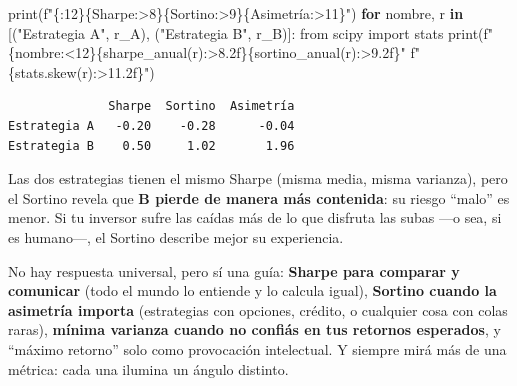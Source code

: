 \documentclass[
  spanish,
  letterpaper,
  DIV=11,
  numbers=noendperiod]{scrreprt}
\newenvironment{Shaded}{\begin{snugshade}}{\end{snugshade}}
\newcommand{\BuiltInTok}[1]{\textcolor[rgb]{0.00,0.23,0.31}{#1}}
\newcommand{\ControlFlowTok}[1]{\textcolor[rgb]{0.00,0.23,0.31}{\textbf{#1}}}
\newcommand{\ImportTok}[1]{\textcolor[rgb]{0.00,0.46,0.62}{#1}}
\newcommand{\KeywordTok}[1]{\textcolor[rgb]{0.00,0.23,0.31}{\textbf{#1}}}
\newcommand{\NormalTok}[1]{\textcolor[rgb]{0.00,0.23,0.31}{#1}}
\newcommand{\SpecialCharTok}[1]{\textcolor[rgb]{0.37,0.37,0.37}{#1}}
\newcommand{\SpecialStringTok}[1]{\textcolor[rgb]{0.13,0.47,0.30}{#1}}
\newcommand{\StringTok}[1]{\textcolor[rgb]{0.13,0.47,0.30}{#1}}
\begin{document}
\begin{Shaded}
\begin{Highlighting}[]
\BuiltInTok{print}\NormalTok{(}\SpecialStringTok{f"}\SpecialCharTok{\{}\StringTok{\textquotesingle{}\textquotesingle{}}\SpecialCharTok{:12\}\{}\StringTok{\textquotesingle{}Sharpe\textquotesingle{}}\SpecialCharTok{:\textgreater{}8\}\{}\StringTok{\textquotesingle{}Sortino\textquotesingle{}}\SpecialCharTok{:\textgreater{}9\}\{}\StringTok{\textquotesingle{}Asimetría\textquotesingle{}}\SpecialCharTok{:\textgreater{}11\}}\SpecialStringTok{"}\NormalTok{)}
\ControlFlowTok{for}\NormalTok{ nombre, r }\KeywordTok{in}\NormalTok{ [(}\StringTok{"Estrategia A"}\NormalTok{, r\_A), (}\StringTok{"Estrategia B"}\NormalTok{, r\_B)]:}
    \ImportTok{from}\NormalTok{ scipy }\ImportTok{import}\NormalTok{ stats}
    \BuiltInTok{print}\NormalTok{(}\SpecialStringTok{f"}\SpecialCharTok{\{}\NormalTok{nombre}\SpecialCharTok{:\textless{}12\}\{}\NormalTok{sharpe\_anual(r)}\SpecialCharTok{:\textgreater{}8.2f\}\{}\NormalTok{sortino\_anual(r)}\SpecialCharTok{:\textgreater{}9.2f\}}\SpecialStringTok{"}
          \SpecialStringTok{f"}\SpecialCharTok{\{}\NormalTok{stats}\SpecialCharTok{.}\NormalTok{skew(r)}\SpecialCharTok{:\textgreater{}11.2f\}}\SpecialStringTok{"}\NormalTok{)}
\end{Highlighting}
\end{Shaded}

\begin{verbatim}
              Sharpe  Sortino  Asimetría
Estrategia A   -0.20    -0.28      -0.04
Estrategia B    0.50     1.02       1.96
\end{verbatim}

Las dos estrategias tienen el mismo Sharpe (misma media, misma
varianza), pero el Sortino revela que \textbf{B pierde de manera más
contenida}: su riesgo ``malo'' es menor. Si tu inversor sufre las caídas
más de lo que disfruta las subas ---o sea, si es humano---, el Sortino
describe mejor su experiencia.

\begin{tcolorbox}[enhanced jigsaw, bottomrule=.15mm, colback=white, opacitybacktitle=0.6, arc=.35mm, toprule=.15mm, opacityback=0, breakable, titlerule=0mm, left=2mm, coltitle=black, colbacktitle=quarto-callout-tip-color!10!white, colframe=quarto-callout-tip-color-frame, leftrule=.75mm, toptitle=1mm, bottomtitle=1mm, title=\textcolor{quarto-callout-tip-color}{\faLightbulb}\hspace{0.5em}{¿Cuál usar?}, rightrule=.15mm]

No hay respuesta universal, pero sí una guía: \textbf{Sharpe para
comparar y comunicar} (todo el mundo lo entiende y lo calcula igual),
\textbf{Sortino cuando la asimetría importa} (estrategias con opciones,
crédito, o cualquier cosa con colas raras), \textbf{mínima varianza
cuando no confiás en tus retornos esperados}, y ``máximo retorno'' solo
como provocación intelectual. Y siempre mirá más de una métrica: cada
una ilumina un ángulo distinto.

\end{tcolorbox}
\end{document}
